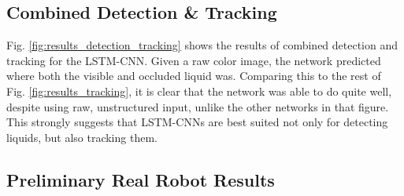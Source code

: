 \documentclass[runningheads,a4paper]{llncs}
\begin{document}
\vspace{-0.3cm}
\subsection{Combined Detection \& Tracking}
\vspace{-0.3cm}


Fig. \ref{fig:results_detection_tracking} shows the results of combined detection and tracking for the LSTM-CNN. Given a raw color image, the network predicted where both the visible and occluded liquid was. Comparing this to the rest of Fig. \ref{fig:results_tracking}, it is clear that the network was able to do quite well, despite using raw, unstructured input, unlike the other networks in that figure. This strongly suggests that LSTM-CNNs are best suited not only for detecting liquids, but also tracking them.

\vspace{-0.3cm}
\subsection{Preliminary Real Robot Results}
\label{sec:real_results}
\vspace{-0.3cm}
\end{document}
